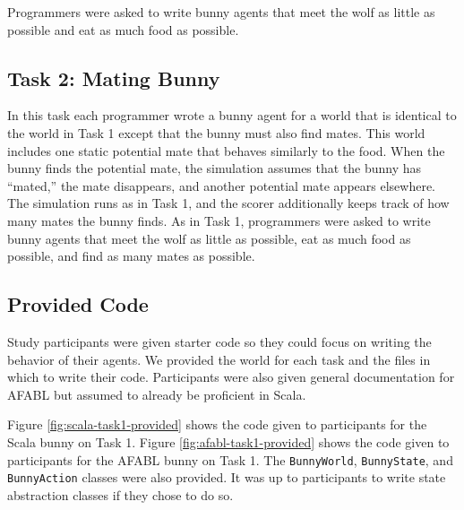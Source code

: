 Programmers were asked to write bunny agents that meet the wolf as little as possible and eat as much food as possible. 

\subsection{Task 2: Mating Bunny}\label{sec:task2}

In this task each programmer wrote a bunny agent for a world that is identical to the world in Task 1 except that the bunny must also find mates.  This world includes one static  potential mate that behaves similarly to the food.  When the bunny finds the potential mate, the simulation assumes that the bunny has ``mated,'' the mate disappears, and another potential mate appears elsewhere.  The simulation runs as in Task 1, and the scorer additionally keeps track of how many mates the bunny finds.  As in Task 1, programmers were asked to write bunny agents that meet the wolf as little as possible, eat as much food as possible, and find as many mates as possible. 

\subsection{Provided Code}

Study participants were given starter code so they could focus on writing the behavior of their agents. We provided the world for each task and the files in which to write their code. Participants were also given general documentation for AFABL but assumed to already be proficient in Scala.

Figure \ref{fig:scala-task1-provided} shows the code given to participants for the Scala bunny on Task 1. Figure \ref{fig:afabl-task1-provided} shows the code given to participants for the AFABL bunny on Task 1. The {\tt BunnyWorld}, {\tt BunnyState}, and {\tt BunnyAction} classes were also provided. It was up to participants to write state abstraction classes if they chose to do so.


